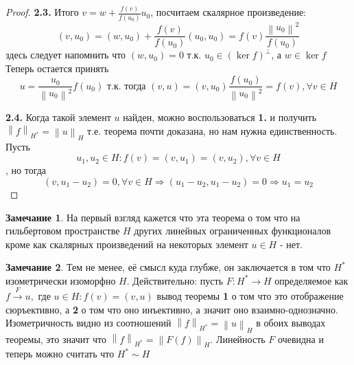 \documentclass[12pt,a4paper]{article}
\theoremstyle{definition}
\newtheorem{corollaryth}{Замечание}[theorem]
\newcommand{\norm}[1]{\left\lVert#1\right\rVert}
\begin{document}
\begin{proof}
	\textbf{2.3.} Итого $v = w + \frac{f(v)}{f(u_0)} u_0$, посчитаем скалярное произведение:
	$$(v, u_0) = (w, u_0) + \frac{f(v)}{f(u_0)} (u_0, u_0) = f(v) \frac{\norm{u_0}^2}{f(u_0)}$$
	здесь следует напомнить что $(w, u_0) = 0$ т.к. $u_0 \in (\ker{f})^\perp$, а $w \in \ker{f}$
	Теперь остается принять 
	$$u = \frac{u_0}{\norm{u_0}^2} f(u_0) \text{ т.к. тогда } (v, u) = (v, u_0) \frac{f(u_0)}{\norm{u_0}^2} = f(v), \forall v \in H$$
	
	\textbf{2.4.} Когда такой элемент $u$ найден, можно воспользоваться \textbf{1.} и получить $\norm{f}_{H^*} = \norm{u}_H$ т.е. теорема почти доказана, но нам нужна единственность. Пусть 
	$$u_1, u_2 \in H: f(v) = (v, u_1) = (v, u_2), \forall v\in H$$
	, но тогда
	$$(v, u_1 - u_2) = 0,\forall v \in H \Rightarrow (u_1 - u_2, u_1 - u_2) = 0 \Rightarrow u_1 = u_2$$
	
	
\end{proof}
\begin{corollaryth}
	На первый взгляд кажется что эта теорема о том что на гильбертовом пространстве $H$ других линейных ограниченных функционалов кроме как скалярных произведений на некоторых элемент $u\in H$ - нет.
\end{corollaryth}
\begin{corollaryth}
	Тем не менее, её смысл куда глубже, он заключается в том что $H^*$ изометрически изоморфно $H$. Действительно: пусть $F: H^* \to H$ определяемое как $f \xrightarrow{F} u, \text{ где } u \in H: f(v) = (v,u)$ вывод теоремы \textbf{1} о том что это отображение сюръективно, а \textbf{2} о том что оно инъективно, а значит оно взаимно-однозначно. Изометричность видно из соотношений $\norm{f}_{H^*} = \norm{u}_H$ в обоих выводах теоремы, это значит что $\norm{f}_{H^*} = \norm{F(f)}_H$. Линейность $F$ очевидна и теперь можно считать что $H^* \sim H$
\end{corollaryth}

\newpage
\renewcommand{\listtheoremname}{Список теорем и утверждений}
\listoftheorems[ignoreall, show={theorem,corollary}]
\end{document}
